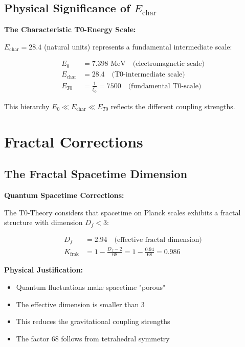 \documentclass[12pt,a4paper]{article}
\begin{document}
	\subsection{Physical Significance of $E_{\text{char}}$}
	
	\begin{keyresult}
		\textbf{The Characteristic T0-Energy Scale:}
		
		$E_{\text{char}} = 28.4$ (natural units) represents a fundamental intermediate scale:
		
		\begin{align}
			E_0 &= 7.398 \text{ MeV} \quad \text{(electromagnetic scale)} \\
			E_{\text{char}} &= 28.4 \quad \text{(T0-intermediate scale)} \\
			E_{T0} &= \frac{1}{\xi_0} = 7500 \quad \text{(fundamental T0-scale)}
		\end{align}
		
		This hierarchy $E_0 \ll E_{\text{char}} \ll E_{T0}$ reflects the different coupling strengths.
	\end{keyresult}
	
	\section{Fractal Corrections}
	
	\subsection{The Fractal Spacetime Dimension}
	
	\begin{derivation}
		\textbf{Quantum Spacetime Corrections:}
		
		The T0-Theory considers that spacetime on Planck scales exhibits a fractal structure with dimension $D_f < 3$:
		
		\begin{align}
			D_f &= 2.94 \quad \text{(effective fractal dimension)} \\
			K_{\text{frak}} &= 1 - \frac{D_f - 2}{68} = 1 - \frac{0.94}{68} = 0.986
		\end{align}
		
		\textbf{Physical Justification:}
		\begin{itemize}
			\item Quantum fluctuations make spacetime "porous"
			\item The effective dimension is smaller than 3
			\item This reduces the gravitational coupling strengths
			\item The factor 68 follows from tetrahedral symmetry
		\end{itemize}
	\end{derivation}
	
\end{document}

